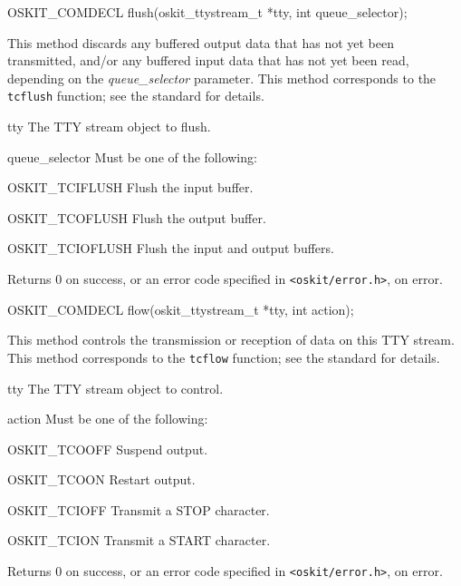 \begin{apisyn}

	\funcproto OSKIT_COMDECL
	flush(oskit_ttystream_t *tty, int queue_selector);
\end{apisyn}
\begin{apidesc}
	This method discards
	any buffered output data that has not yet been transmitted,
	and/or any buffered input data that has not yet been read,
	depending on the \emph{queue_selector} parameter.
	This method corresponds to the \posix{} \texttt{tcflush} function;
	see the \posix{} standard for details.
\end{apidesc}
\begin{apiparm}
	\item[tty]
		The TTY stream object to flush.
	\item[queue_selector]
		Must be one of the following:
		\begin{icsymlist}
		\item[OSKIT_TCIFLUSH]	Flush the input buffer.
		\item[OSKIT_TCOFLUSH]	Flush the output buffer.
		\item[OSKIT_TCIOFLUSH]	Flush the input and output buffers.
		\end{icsymlist}
\end{apiparm}
\begin{apiret}
	Returns 0 on success, or an error code specified in
	{\tt <oskit/error.h>}, on error.
\end{apiret}

\begin{apisyn}

	\funcproto OSKIT_COMDECL
	flow(oskit_ttystream_t *tty, int action);
\end{apisyn}
\begin{apidesc}
	This method controls the transmission or reception of data
	on this TTY stream.
	This method corresponds to the \posix{} \texttt{tcflow} function;
	see the \posix{} standard for details.
\end{apidesc}
\begin{apiparm}
	\item[tty]
		The TTY stream object to control.
	\item[action]
		Must be one of the following:
		\begin{icsymlist}
		\item[OSKIT_TCOOFF]	Suspend output.
		\item[OSKIT_TCOON]	Restart output.
		\item[OSKIT_TCIOFF]	Transmit a STOP character.
		\item[OSKIT_TCION]	Transmit a START character.
		\end{icsymlist}
\end{apiparm}
\begin{apiret}
	Returns 0 on success, or an error code specified in
	{\tt <oskit/error.h>}, on error.
\end{apiret}

